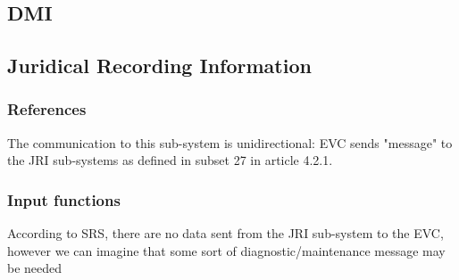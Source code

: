 \documentclass{template/openetcs_article}
\begin{document}
	\subsection{DMI}
	\subsection{Juridical Recording Information}
		\subsubsection{References}
			The communication to this sub-system is unidirectional: EVC sends "message" to the JRI sub-systems as defined in subset 27 in article 4.2.1.
		\subsubsection{Input functions}
			According to SRS, there are no data sent from the JRI sub-system to the EVC, however we can imagine that some sort of diagnostic/maintenance message may be needed
\end{document}
